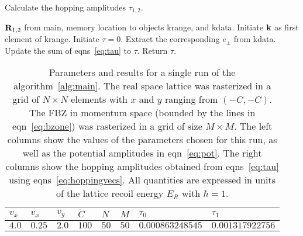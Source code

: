 \documentclass[a4paper,10pt]{article}
\begin{document}
\begin{algorithm}
\caption{Calculate the hopping amplitudes $\tau_{1,2}$.}
\label{alg:hopping}                           %
\begin{algorithmic}                    %
\REQUIRE ${\bf R}_{1,2}$ from main, memory location to objects krange, and kdata.
\STATE Initiate ${\bf k}$ as first element of krange.
\STATE Initiate $\tau=0$.
\STATE Extract the corresponding $e_\pm$ from kdata.
\STATE Update the sum of eqns~\ref{eq:tau} to $\tau$.
\ENDFOR
\STATE Return $\tau$.
\end{algorithmic}
\end{algorithm}
\pagebreak
\begin{table}[h!bt]
\begin{center}
\begin{tabular}{ | l  l  l  l l l|| l | l |}
      \hline
  $v_{\bar{x}}$ 	&$v_x$  &$v_y$ &$C$ &$N$ &$M$	& $\tau_0$    & $\tau_1$ \\  \hline  \hline
  $4.0$			&$0.25$	&$2.0$ &$100$ &$50$ &$50$ &$0.000863248545$ &$0.001317922756$ \\ \hline
     \end{tabular}
\caption{Parameters and results for a single run of the algorithm~\ref{alg:main}. The real space lattice was rasterized in a grid of $N\times N$ elements with $x$ and $y$ ranging from $(-C,-C)$. The FBZ in momentum space (bounded by the lines in eqn~\ref{eq:bzone}) was rasterized in a grid of size $M\times M$. The left columns show the values of the parameters chosen for this run, as well as the potential amplitudes in eqn~\ref{eq:pot}. The right columns show the hopping amplitudes obtained from eqns~\ref{eq:tau} using eqns~\ref{eq:hoppingvecs}. All quantities are expressed in units of the lattice recoil energy $E_R$ with $\hbar=1$.}
\label{tab:params:tau}
\end{center}
\end{table}
\end{document}
